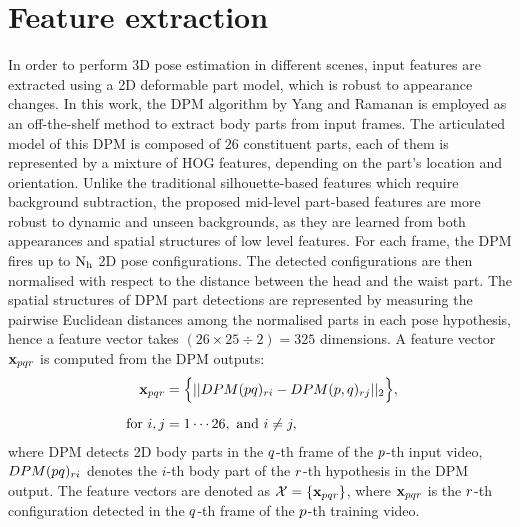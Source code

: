\section{Feature extraction}
\label{sec/body/featureextraction} 

In order to perform 3D pose estimation in different scenes, input features are extracted using a 2D deformable part model, which is robust to appearance changes.  
In this work, the DPM algorithm by Yang and Ramanan \cite{Yang2011} is employed as an off-the-shelf method to extract body parts from input frames. 
The articulated model of this DPM is composed of $26$ constituent parts, each of them is represented by a mixture of HOG features, depending on the part's location and orientation. 
Unlike the traditional silhouette-based features which require background subtraction, the proposed mid-level part-based features are more robust to dynamic and unseen backgrounds, as they are learned from both appearances and spatial structures of low level features. 
For each frame, the DPM fires up to $\mathrm{N_{h}}$ 2D pose configurations.  
The detected configurations are then normalised with respect to the distance between the head and the waist part. 
The spatial structures of DPM part detections are represented by measuring the pairwise Euclidean distances among the normalised parts in each pose hypothesis, hence a feature vector takes $(26 \times 25 \div 2) = 325$ dimensions.
A feature vector $\mathbf{x}_{pqr}$ is computed from the DPM outputs:
\begin{equation}
	\label{eqn/body/feature} 
	\begin{aligned}
		\mathbf{x}_{pqr} & = \Big\{ || DPM(pq)_{r i} - DPM(p, q)_{r j} ||_{2} \Big\}, \\[2mm]
		\mbox{ for } i, j & = 1\cdots26, \mbox{ and } i \not= j,
	\end{aligned}
\end{equation}
where DPM detects 2D body parts in the $q$-th frame of the $p$-th input video, $DPM(pq)_{r i}$ denotes the $i$-th body part of the $r$-th hypothesis in the DPM output. The feature vectors are denoted as $\mathcal{X} = \{\mathbf{x}_{pqr}\}$, where $\mathbf{x}_{pqr}$ is the $r$-th configuration detected in the $q$-th frame of the $p$-th training video. 

